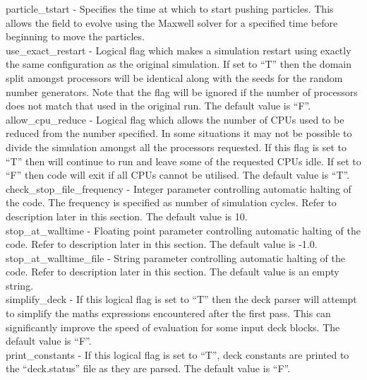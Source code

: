 {\emphtext particle\_tstart} - Specifies the time at which to start pushing
particles. This allows the field to evolve using the Maxwell solver for a
specified time before beginning to move the particles.\\

{\emphtext use\_exact\_restart} - Logical flag which makes a simulation
  restart using exactly the same configuration as the original simulation. If
  set to ``T'' then the domain split amongst processors will be identical
  along with the seeds for the random number generators. Note that the flag
  will be ignored if the number of processors does not match that used in the
  original run. The default value is ``F''.\\

{\emphtext allow\_cpu\_reduce} - Logical flag which allows the number of CPUs
  used to be reduced from the number specified. In some situations it may not
  be possible to divide the simulation amongst all the processors requested.
  If this flag is set to ``T'' then {\EPOCH} will continue to run and leave
  some of the requested CPUs idle. If set to ``F'' then code will exit if all
  CPUs cannot be utilised. The default value is ``T''.\\

{\emphtext check\_stop\_file\_frequency} - Integer parameter controlling
  automatic halting of the code. The frequency is specified as number of
  simulation cycles. Refer to description later in this section.
  The default value is 10.\\

{\emphtext stop\_at\_walltime} - Floating point parameter controlling
  automatic halting of the code. Refer to description later in this section.
  The default value is -1.0.\\

{\emphtext stop\_at\_walltime\_file} - String parameter controlling
  automatic halting of the code. Refer to description later in this section.
  The default value is an empty string.\\

{\emphtext simplify\_deck} - If this logical flag is set to ``T'' then the deck
  parser will attempt to simplify the maths expressions encountered after the
  first pass. This can significantly improve the speed of evaluation for some
  input deck blocks. The default value is ``F''.\\

{\emphtext print\_constants} - If this logical flag is set to ``T'', deck
  constants are printed to the ``deck.status'' file as they are parsed. The
  default value is ``F''.\\

